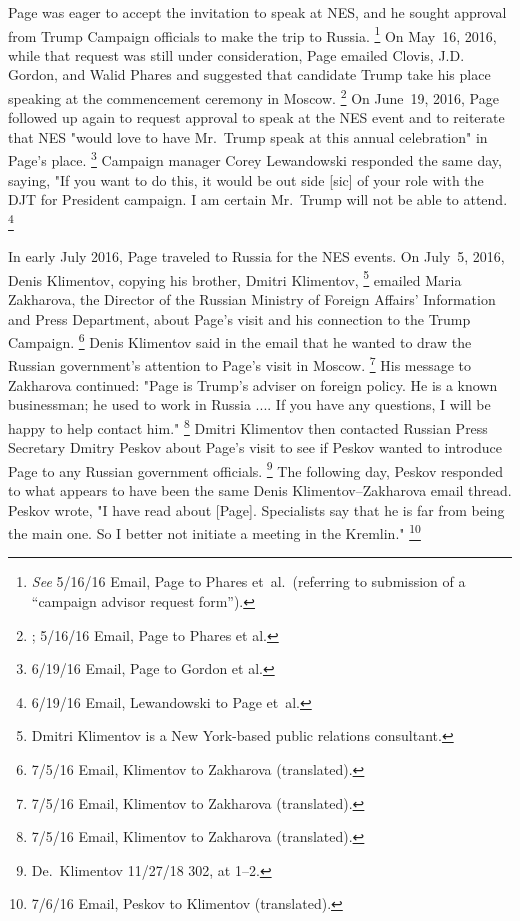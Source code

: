 Page was eager to accept the invitation to speak at NES, and he sought approval from Trump Campaign officials to make the trip to Russia.%
\footnote{\textit{See} 5/16/16 Email, Page to Phares et~al.\
(referring to submission of a “campaign advisor request form”).}
On May~16, 2016, while that request was still under consideration, Page emailed Clovis, J.D. Gordon, and Walid Phares and suggested that candidate Trump take his place speaking at the commencement ceremony in Moscow.%
\footnote{\blackout{Grand Jury}; 5/16/16 Email, Page to Phares et al.}
On June~19, 2016, Page followed up again to request approval to speak at the NES event and to reiterate that NES "would love to have Mr.~Trump speak at this annual celebration" in Page's place.%
\footnote{6/19/16 Email, Page to Gordon et al.}
Campaign manager Corey Lewandowski responded the same day, saying, "If you want to do this, it would be out side [sic] of your role with the DJT for President campaign. I am certain Mr.~Trump will not be able to attend.%
\footnote{6/19/16 Email, Lewandowski to Page et~al.}

In early July 2016, Page traveled to Russia for the NES events.
On July~5, 2016, Denis Klimentov, copying his brother, Dmitri Klimentov,%
\footnote{Dmitri Klimentov is a New York-based public relations consultant.}
emailed Maria Zakharova, the Director of the Russian Ministry of Foreign Affairs' Information and Press Department, about Page's visit and his connection to the Trump Campaign.%
\footnote{7/5/16 Email, Klimentov to Zakharova (translated).}
Denis Klimentov said in the email that he wanted to draw the Russian government's attention to Page's visit in Moscow.%
\footnote{7/5/16 Email, Klimentov to Zakharova (translated).}
His message to Zakharova continued: "Page is Trump's adviser on foreign policy.
He is a known businessman; he used to work in Russia ....
If you have any questions, I will be happy to help contact him."%
\footnote{7/5/16 Email, Klimentov to Zakharova (translated).}
Dmitri Klimentov then contacted Russian Press Secretary Dmitry Peskov about Page's visit to see if Peskov wanted to introduce Page to any Russian government officials.%
\footnote{De.~Klimentov 11/27/18 302, at 1--2.}
The following day, Peskov responded to what appears to have been the same Denis Klimentov--Zakharova email thread.
Peskov wrote, "I have read about [Page].
Specialists say that he is far from being the main one.
So I better not initiate a meeting in the Kremlin."%
\footnote{7/6/16 Email, Peskov to Klimentov (translated).}

